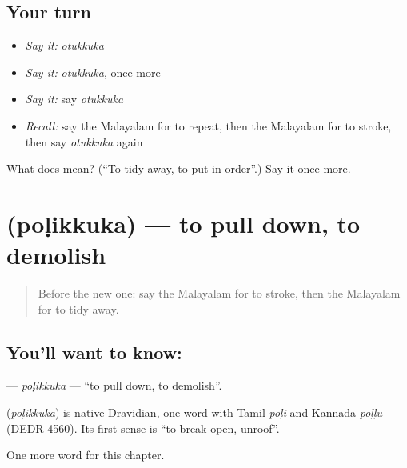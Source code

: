\subsection*{Your turn}
\begin{itemize}
\raggedright
  \item \emph{Say it:} \emph{otukkuka}
  \item \emph{Say it:} \emph{otukkuka}, once more
  \item \emph{Say it:} say \emph{otukkuka}
  \item \emph{Recall:} say the Malayalam for to repeat, then the Malayalam for to stroke, then say \emph{otukkuka} again
\end{itemize}

\begin{tcolorbox}[breakable,colback=teal!4,colframe=teal!35!black,title={Before you move on}]
What does  mean? (\textquotedblleft{}To tidy away, to put in order\textquotedblright{}.) Say it once more.
\end{tcolorbox}
\section[\texorpdfstring{\ml{പൊളിക്കുക} (poḷikkuka)}{പൊളിക്കുക (poḷikkuka)}]{ (poḷikkuka) — to pull down, to demolish}

\label{lesson:ML-C311-polikkuka}



\begin{quote}
Before the new one: say the Malayalam for to stroke, then the Malayalam for to tidy away.
\end{quote}

\subsection*{You'll want to know: }
\textbf{} — \emph{poḷikkuka} — \textquotedblleft{}to pull down, to demolish\textquotedblright{}.

\begin{cousinweb}
\textbf{} (\emph{poḷikkuka}) is native Dravidian, one word with Tamil \emph{poḷi} and Kannada \emph{poḷḷu} (DEDR 4560). Its first sense is \textquotedblleft{}to break open, unroof\textquotedblright{}.
\end{cousinweb}

\begin{grammarlens}[title={What you've built}]
One more word for this chapter.
\end{grammarlens}

